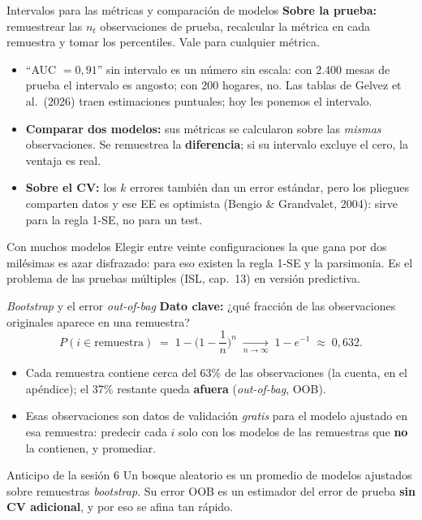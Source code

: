 \documentclass{beamer}
\newcommand{\1}{\mathbb{I}}
\begin{document}
\begin{frame}{Intervalos para las métricas y comparación de modelos}
\small
\textbf{Sobre la prueba:} remuestrear las $n_t$ observaciones de prueba, recalcular la métrica en cada remuestra y tomar los percentiles. Vale para cualquier métrica.
\pause
\begin{itemize}\itemsep3pt
  \item ``AUC $= 0{,}91$'' sin intervalo es un número sin escala: con 2.400 mesas de prueba el intervalo es angosto; con 200 hogares, no. Las tablas de Gelvez et al.\ (2026) traen estimaciones puntuales; hoy les ponemos el intervalo. \pause
  \item \textbf{Comparar dos modelos:} sus métricas se calcularon sobre las \emph{mismas} observaciones. Se remuestrea la \textbf{diferencia}; si su intervalo excluye el cero, la ventaja es real. \pause
  \item \textbf{Sobre el CV:} los $k$ errores también dan un error estándar, pero los pliegues comparten datos y ese EE es optimista (Bengio \& Grandvalet, 2004): sirve para la regla 1-SE, no para un test.
\end{itemize}
\pause
\begin{block}{Con muchos modelos}
Elegir entre veinte configuraciones la que gana por dos milésimas es azar disfrazado: para eso existen la regla 1-SE y la parsimonia. Es el problema de las pruebas múltiples (ISL, cap.\ 13) en versión predictiva.
\end{block}
\end{frame}

\begin{frame}{\emph{Bootstrap} y el error \emph{out-of-bag}}
\small
\textbf{Dato clave:} ¿qué fracción de las observaciones originales aparece en una remuestra?
\[ P(i \in \text{remuestra}) \;=\; 1 - \Big(1 - \frac{1}{n}\Big)^{n} \;\xrightarrow[n \to \infty]{}\; 1 - e^{-1} \;\approx\; 0{,}632. \]
\pause
\begin{itemize}\itemsep4pt
  \item Cada remuestra contiene cerca del 63\% de las observaciones (la cuenta, en el apéndice); el 37\% restante queda \textbf{afuera} (\emph{out-of-bag}, OOB).
  \item Esas observaciones son datos de validación \emph{gratis} para el modelo ajustado en esa remuestra: predecir cada $i$ solo con los modelos de las remuestras que \textbf{no} la contienen, y promediar.
\end{itemize}
\pause
\vspace{0.1cm}
\begin{block}{Anticipo de la sesión 6}
Un bosque aleatorio es un promedio de modelos ajustados sobre remuestras \emph{bootstrap}. Su error OOB es un estimador del error de prueba \textbf{sin CV adicional}, y por eso se afina tan rápido.
\end{block}
\end{frame}
\end{document}
